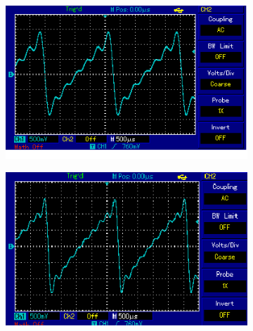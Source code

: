 \begin{figure}[H]
  \centering
  \begin{subfigure}{0.48\textwidth}
  \includegraphics[width=\textwidth]{Saegespannung/5.png}
\end{subfigure}
\begin{subfigure}{0.48\textwidth}
  \includegraphics[width=\textwidth]{Saegespannung/8.png}
\end{subfigure}
\end{figure}
